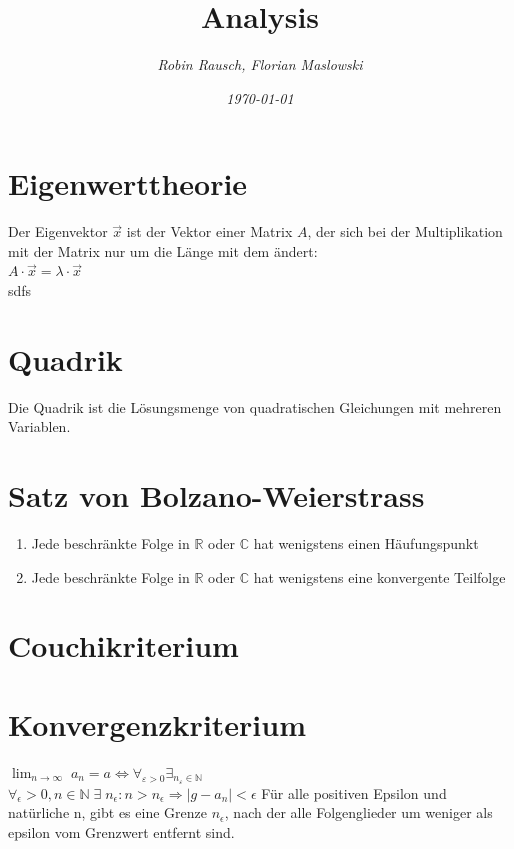 \documentclass[12pt,a4paper]{article}
\author{\slshape Robin Rausch, Florian Maslowski}
\title{Analysis}
\date{\slshape \today}
\begin{document}
\maketitle
\tableofcontents
\newpage

\section{Eigenwerttheorie}
	Der Eigenvektor $\overrightarrow{x} $ ist der Vektor einer Matrix $A$, der sich bei der Multiplikation mit der Matrix
	nur um die Länge mit dem ändert:\\
	\Large $A \cdot \overrightarrow{x} = \lambda \cdot \overrightarrow{x} $\\
	\normalsize sdfs


\section{Quadrik}   
    Die Quadrik ist die Lösungsmenge von quadratischen Gleichungen mit mehreren Variablen.
	
\section{Satz von Bolzano-Weierstrass}
	\begin{enumerate}
		\item Jede beschränkte Folge in $\mathbb{R}$ oder $\mathbb{C}$ hat wenigstens einen Häufungspunkt
  		\item Jede beschränkte Folge in $\mathbb{R}$ oder $\mathbb{C}$ hat wenigstens eine konvergente Teilfolge
	\end{enumerate}
	
\section{Couchikriterium}

\section{Konvergenzkriterium}
	$\lim_{n \to \infty} \; a_n = a \Leftrightarrow \forall_{\varepsilon > 0} \exists _{n_\varepsilon \in  \mathbb{N}}$\\
	$\forall_\epsilon > 0, n \in \mathbb{N}\; \exists\; n_\epsilon: n > n_\epsilon \Rightarrow |g-a_n| < \epsilon $
	Für alle positiven Epsilon und natürliche n, gibt es eine Grenze $n_\epsilon $, nach der alle Folgenglieder um weniger als epsilon vom Grenzwert entfernt sind.\\ 
\end{document}
